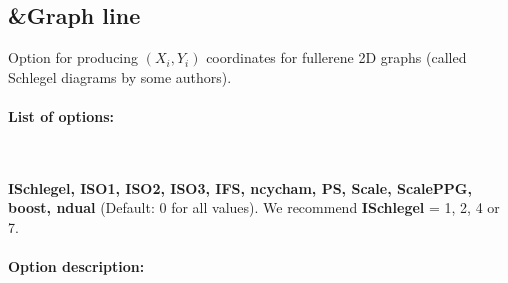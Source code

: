 \documentclass[article,a4paper,twoside]{memoir}
\newcommand{\paramname}[1]{{\color{green}\textbf{#1}}}
\begin{document}
\subsection{\&Graph line}
 Option for producing $(X_i, Y_i)$ coordinates for fullerene 2D graphs (called Schlegel diagrams by some authors).
\paragraph{List of options:}\ 

 \paramname{ISchlegel, ISO1, ISO2, ISO3, IFS, ncycham, PS, Scale, ScalePPG, boost, ndual} (Default: 0 for all values). We recommend \paramname{ISchlegel} = 1, 2, 4 or 7.


\paragraph{Option description:}
\end{document}
